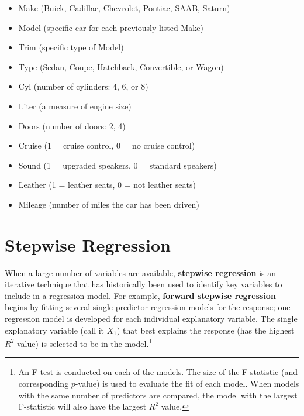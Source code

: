 \documentclass[
]{report}
\providecommand{\tightlist}{%
  \setlength{\itemsep}{0pt}\setlength{\parskip}{0pt}}
\begin{document}
\begin{itemize}
\tightlist
\item
  Make (Buick, Cadillac, Chevrolet, Pontiac, SAAB, Saturn)
\item
  Model (specific car for each previously listed Make)
\item
  Trim (specific type of Model)
\item
  Type (Sedan, Coupe, Hatchback, Convertible, or Wagon)
\item
  Cyl (number of cylinders: 4, 6, or 8)
\item
  Liter (a measure of engine size)
\item
  Doors (number of doors: 2, 4)
\item
  Cruise (1 = cruise control, 0 = no cruise control)
\item
  Sound (1 = upgraded speakers, 0 = standard speakers)
\item
  Leather (1 = leather seats, 0 = not leather seats)
\item
  Mileage (number of miles the car has been driven)
\end{itemize}

\hypertarget{stepwise-regression}{%
\section*{Stepwise Regression}\label{stepwise-regression}}

When a large number of variables are available, \textbf{stepwise regression} is an iterative technique that has historically been used to identify key variables to include in a regression model. For example, \textbf{forward stepwise regression} begins by fitting several single-predictor regression models for the response; one regression model is developed for each individual explanatory variable. The single explanatory variable (call it \(X_1\)) that best explains the response (has the highest \(R^2\) value) is selected to be in the model.\footnote{An F-test is conducted on each of the models. The size of the F-statistic (and corresponding \(p\)-value) is used to evaluate the fit of each model. When models with the same number of predictors are compared, the model with the largest F-statistic will also have the largest \(R^2\) value.}
\end{document}
